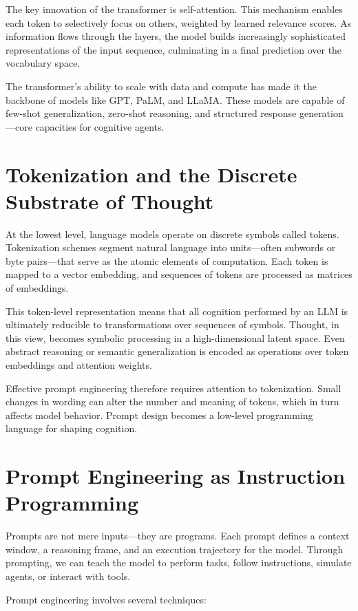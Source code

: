 \documentclass{book}
\begin{document}
The key innovation of the transformer is self-attention. This mechanism enables each token to selectively focus on others, weighted by learned relevance scores. As information flows through the layers, the model builds increasingly sophisticated representations of the input sequence, culminating in a final prediction over the vocabulary space.

The transformer’s ability to scale with data and compute has made it the backbone of models like GPT, PaLM, and LLaMA. These models are capable of few-shot generalization, zero-shot reasoning, and structured response generation—core capacities for cognitive agents.

\section{Tokenization and the Discrete Substrate of Thought}

At the lowest level, language models operate on discrete symbols called tokens. Tokenization schemes segment natural language into units—often subwords or byte pairs—that serve as the atomic elements of computation. Each token is mapped to a vector embedding, and sequences of tokens are processed as matrices of embeddings.

This token-level representation means that all cognition performed by an LLM is ultimately reducible to transformations over sequences of symbols. Thought, in this view, becomes symbolic processing in a high-dimensional latent space. Even abstract reasoning or semantic generalization is encoded as operations over token embeddings and attention weights.

Effective prompt engineering therefore requires attention to tokenization. Small changes in wording can alter the number and meaning of tokens, which in turn affects model behavior. Prompt design becomes a low-level programming language for shaping cognition.

\section{Prompt Engineering as Instruction Programming}

Prompts are not mere inputs—they are programs. Each prompt defines a context window, a reasoning frame, and an execution trajectory for the model. Through prompting, we can teach the model to perform tasks, follow instructions, simulate agents, or interact with tools.

Prompt engineering involves several techniques:
\end{document}
